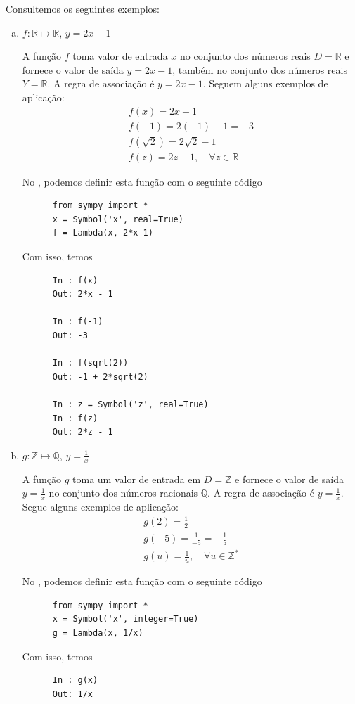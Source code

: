 \begin{ex}
  Consultemos os seguintes exemplos:
  \begin{enumerate}[a)]
  \item $f:\mathbb{R}\mapsto\mathbb{R}$, $y=2x-1$
    
    A função $f$ toma valor de entrada $x$ no conjunto dos números reais $D=\mathbb{R}$ e fornece o valor de saída $y = 2x-1$, também no conjunto dos números reais $Y=\mathbb{R}$. A regra de associação é $y=2x-1$. Seguem alguns exemplos de aplicação:
    \begin{gather}
      f(x) = 2x-1\\
      f(-1) = 2(-1)-1 = -3\\
      f(\sqrt{2}) = 2\sqrt{2}-1\\
      f(z) = 2z-1,\quad \forall z\in\mathbb{R}
    \end{gather}

    \ifispython
    No \python, podemos definir esta função com o seguinte código
    \begin{lstlisting}
      from sympy import *
      x = Symbol('x', real=True)
      f = Lambda(x, 2*x-1)
    \end{lstlisting}
    Com isso, temos
    \begin{lstlisting}
      In : f(x)
      Out: 2*x - 1
      
      In : f(-1)
      Out: -3
      
      In : f(sqrt(2))
      Out: -1 + 2*sqrt(2)
      
      In : z = Symbol('z', real=True)
      In : f(z)
      Out: 2*z - 1
    \end{lstlisting}
    \fi
    
  \item $g:\mathbb{Z}\mapsto\mathbb{Q}$, $\displaystyle y=\frac{1}{x}$
    
    A função $g$ toma um valor de entrada em $D=\mathbb{Z}$ e fornece o valor de saída $\displaystyle y=\frac{1}{x}$ no conjunto dos números racionais $\mathbb{Q}$. A regra de associação é $\displaystyle y = \frac{1}{x}$. Segue alguns exemplos de aplicação:
    \begin{gather}
      g(2) = \frac{1}{2}\\
      g(-5) = \frac{1}{-5} = -\frac{1}{5}\\
      g(u) = \frac{1}{u},\quad\forall u\in\mathbb{Z}^*
    \end{gather}

        \ifispython
    No \python, podemos definir esta função com o seguinte código
    \begin{lstlisting}
      from sympy import *
      x = Symbol('x', integer=True)
      g = Lambda(x, 1/x)
    \end{lstlisting}
    Com isso, temos
    \begin{lstlisting}
      In : g(x)
      Out: 1/x
      

\end{lstlisting}
\end{enumerate}
\end{ex}
